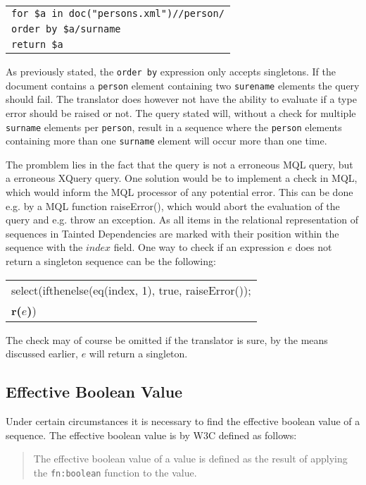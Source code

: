 \begin{center}
\begin{tabular}{l}
\texttt{for \$a in doc("persons.xml")//person/} \\
\texttt{order by \$a/surname} \\
\texttt{return \$a}
\end{tabular}
\end{center}

As previously stated, the \texttt{order by} expression only accepts singletons. If the document contains a
\texttt{person} element containing two \texttt{surename} elements the query should fail. The translator does
however not have the ability to evaluate if a type error should be raised or not. The query stated will, without a
check for multiple \texttt{surname} elements per \texttt{person}, result in a sequence where the \texttt{person}
elements containing more than one \texttt{surname} element will occur more than one time. 

The promblem lies in the fact that the query is not a erroneous MQL query, but a erroneous XQuery query. One
solution would be to implement a check in MQL, which would inform the MQL processor of any potential error. This
can be done e.g. by a MQL function \textsf{raiseError()}, which would abort the evaluation of the query and e.g.
throw an exception. As all items in the relational representation of sequences in Tainted Dependencies are marked
with their position within the sequence with the $index$ field. One way to check if an expression $e$ does not
return a singleton sequence can be the following:
\begin{center}
\begin{tabular}{l}
\textsf{select(ifthenelse(eq(index, 1), true, raiseError());} \\ \quad
\textbf{r(}$e$\textbf{)}\textsf{)}
\end{tabular}
\end{center}

The check may of course be omitted if the translator is sure, by the means discussed earlier, $e$ will return a
singleton.

\subsection{Effective Boolean Value}
\label{sect:disc:effBool}
Under certain circumstances it is necessary to find the effective boolean value of a sequence. The effective
boolean value is by W3C defined as follows\cite{w3c00}: 
\begin{quote}
The effective boolean value of a value is defined as the result of applying the \texttt{fn:boolean} function to
the value.
\end{quote}

